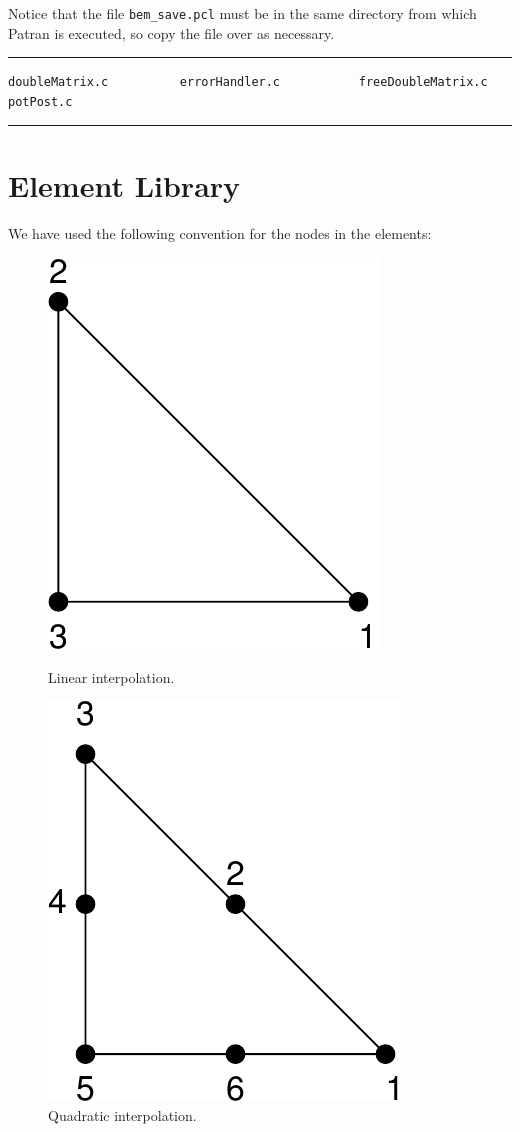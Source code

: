 \documentclass[12pt]{article}
\begin{document}
Notice that the file \verb+bem_save.pcl+ must be in the same directory from which Patran is executed, so copy the file over as necessary.

\vspace{12pt}\hrule


\small\begin{verbatim}
doubleMatrix.c          errorHandler.c           freeDoubleMatrix.c
potPost.c
\end{verbatim}\normalsize

\hrule

\pagebreak
\section{Element Library}
We have used the following convention for the nodes in the elements:

\begin{figure}[!hbt]
\begin{minipage}[b]{0.5\linewidth}
\centering
\includegraphics[width = 0.4\linewidth, viewport = 0 0 159 188]{tria3.pdf}
\caption{Linear interpolation.}
\end{minipage}
\hspace{0.5cm}
\begin{minipage}[b]{0.5\linewidth}
\centering
\includegraphics[width = 0.4\linewidth, viewport = 0 0 172 192]{tria6.pdf}
\caption{Quadratic interpolation.}
\end{minipage}
\end{figure}
\end{document}
